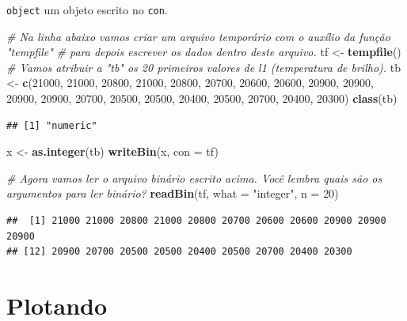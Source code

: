 \documentclass[]{book}
\newenvironment{Shaded}{\begin{snugshade}}{\end{snugshade}}
\newcommand{\KeywordTok}[1]{\textcolor[rgb]{0.13,0.29,0.53}{\textbf{#1}}}
\newcommand{\DataTypeTok}[1]{\textcolor[rgb]{0.13,0.29,0.53}{#1}}
\newcommand{\DecValTok}[1]{\textcolor[rgb]{0.00,0.00,0.81}{#1}}
\newcommand{\StringTok}[1]{\textcolor[rgb]{0.31,0.60,0.02}{#1}}
\newcommand{\CommentTok}[1]{\textcolor[rgb]{0.56,0.35,0.01}{\textit{#1}}}
\newcommand{\NormalTok}[1]{#1}
\theoremstyle{definition}
\theoremstyle{definition}
\theoremstyle{definition}
\theoremstyle{remark}
\begin{document}
\texttt{object} um objeto escrito no \texttt{con}.

\begin{Shaded}
\begin{Highlighting}[]
\CommentTok{# Na linha abaixo vamos criar um arquivo temporário com o auxílio da função "tempfile" }
\CommentTok{# para depois escrever os dados dentro deste arquivo.}
\NormalTok{tf <-}\StringTok{ }\KeywordTok{tempfile}\NormalTok{()}
\CommentTok{# Vamos atribuir a "tb" os 20 primeiros valores de l1 (temperatura de brilho).}
\NormalTok{tb <-}\StringTok{ }\KeywordTok{c}\NormalTok{(}\DecValTok{21000}\NormalTok{, }\DecValTok{21000}\NormalTok{, }\DecValTok{20800}\NormalTok{, }\DecValTok{21000}\NormalTok{, }\DecValTok{20800}\NormalTok{, }\DecValTok{20700}\NormalTok{, }\DecValTok{20600}\NormalTok{, }\DecValTok{20600}\NormalTok{, }\DecValTok{20900}\NormalTok{, }\DecValTok{20900}\NormalTok{, }
        \DecValTok{20900}\NormalTok{, }\DecValTok{20900}\NormalTok{, }\DecValTok{20700}\NormalTok{, }\DecValTok{20500}\NormalTok{, }\DecValTok{20500}\NormalTok{, }\DecValTok{20400}\NormalTok{, }\DecValTok{20500}\NormalTok{, }\DecValTok{20700}\NormalTok{, }\DecValTok{20400}\NormalTok{, }\DecValTok{20300}\NormalTok{)}
\KeywordTok{class}\NormalTok{(tb)}
\end{Highlighting}
\end{Shaded}

\begin{verbatim}
## [1] "numeric"
\end{verbatim}

\begin{Shaded}
\begin{Highlighting}[]
\NormalTok{x <-}\StringTok{ }\KeywordTok{as.integer}\NormalTok{(tb)}
\KeywordTok{writeBin}\NormalTok{(x, }\DataTypeTok{con =}\NormalTok{ tf)}

\CommentTok{# Agora vamos ler o arquivo binário escrito acima. Você lembra quais são os argumentos para ler binário?}
\KeywordTok{readBin}\NormalTok{(tf,}
        \DataTypeTok{what =} \StringTok{"integer"}\NormalTok{,}
        \DataTypeTok{n =} \DecValTok{20}\NormalTok{)}
\end{Highlighting}
\end{Shaded}

\begin{verbatim}
##  [1] 21000 21000 20800 21000 20800 20700 20600 20600 20900 20900 20900
## [12] 20900 20700 20500 20500 20400 20500 20700 20400 20300
\end{verbatim}

\chapter{Plotando}\label{plotando}
\end{document}
